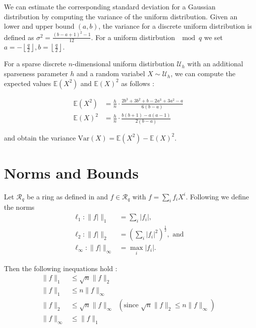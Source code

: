We can estimate the corresponding standard deviation for a Gaussian distribution by computing the variance of the uniform distribution. Given an lower and upper bound $(a, b)$, the variance for a discrete uniform distribution is defined as $\sigma^2 = \frac{(b - a + 1)^2 - 1}{12}$. For a uniform distirbution $\mod q$ we set $a = -\left\lfloor \frac{q}{2} \right\rfloor, b = \left\lfloor \frac{q}{2} \right\rfloor$.

For a sparse discrete $n$-dimensional uniform distirbution $\mathcal{U}_h$ with an additional sparseness parameter $h$ and a random variabel $X \sim \mathcal{U}_h$, we can compute the expected values $\mathbb{E}(X^2)$ and $\mathbb{E}(X)^2$ as follows \cite{APS15}:

\begin{align}
    \mathbb{E}(X^2) & = \frac{h}{n} \cdot \frac{2b^3 + 3b^2 + b - 2a^3 + 3a^2 - a}{6(b - a)} \\
    \mathbb{E}(X)^2 & = \frac{h}{n} \cdot \frac{b (b + 1) - a(a - 1)}{2(b - a)}
\end{align}

and obtain the variance $\text{Var}(X) = \mathbb{E}(X^2) - \mathbb{E}(X)^2$.



\section{Norms and Bounds} \label{sec:norm-bounds}%
Let $\mathcal{R}_q$ be a ring as defined in \cite{BDLOP18} and $f \in \mathcal{R}_q$ with $f = \sum_i f_i X^i$. Following \cite{BDLOP18} we define the norms
\begin{align}
    \ell_1 : \| f| \|_1           & = \sum_i |f_i|,                                           \\
    \ell_2 : \| f| \|_2           & = \left(\sum_i |f_i|^2\right) ^{\frac{1}{2}}, \text{ and} \\
    \ell_\infty : \| f| \|_\infty & = \max_i |f_i|.
\end{align}

Then the following inequations hold \cite{BDLOP18}:
\begin{align}
    \| f \|_1      & \leq \sqrt{n} \| f \|_2 \label{norm1}                                                                    \\
    \| f \|_1      & \leq n \| f \|_\infty \label{norm2}                                                                      \\
    \| f \|_2      & \leq \sqrt{n} \| f \|_\infty \;\;(\text{since }  \sqrt{n} \| f \|_2 \leq n \| f \|_\infty) \label{norm3} \\
    \| f \|_\infty & \leq \| f \|_1 \label{norm4}
\end{align}

